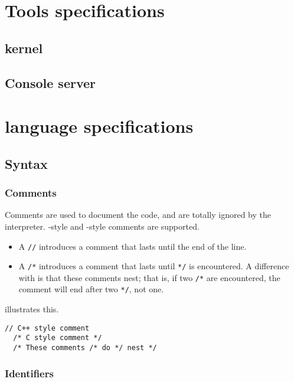 \documentclass[openright,twoside,12pt]{report}
\begin{document}
\chapter{Tools specifications}

\section{\urbi kernel}
\section{Console server}
\section{\umake}

\FloatBarrier
\chapter{\us language specifications}

\FloatBarrier
\section{Syntax}
\subsection{Comments}

Comments are used to document the code, and are totally ignored by the
\us interpreter. \Cxx-style and \C-style comments are supported.

\begin{itemize}
\item A \lstinline|//| introduces a comment that lasts until the end
  of the line.
\item A \lstinline|/*| introduces a comment that lasts until
  \lstinline|*/| is encountered. A difference with \C is that these
  comments nest; that is, if two \lstinline|/*| are encountered, the
  comment will end after two \lstinline|*/|, not one.
\end{itemize}

 illustrates this.

\begin{lstlisting}[caption=Comments,label=lst:comments,float=\floatpos]
  // C++ style comment
  /* C style comment */
  /* These comments /* do */ nest */
\end{lstlisting}

\subsection{Identifiers}
\label{sect:us-syn-id}
\end{document}
